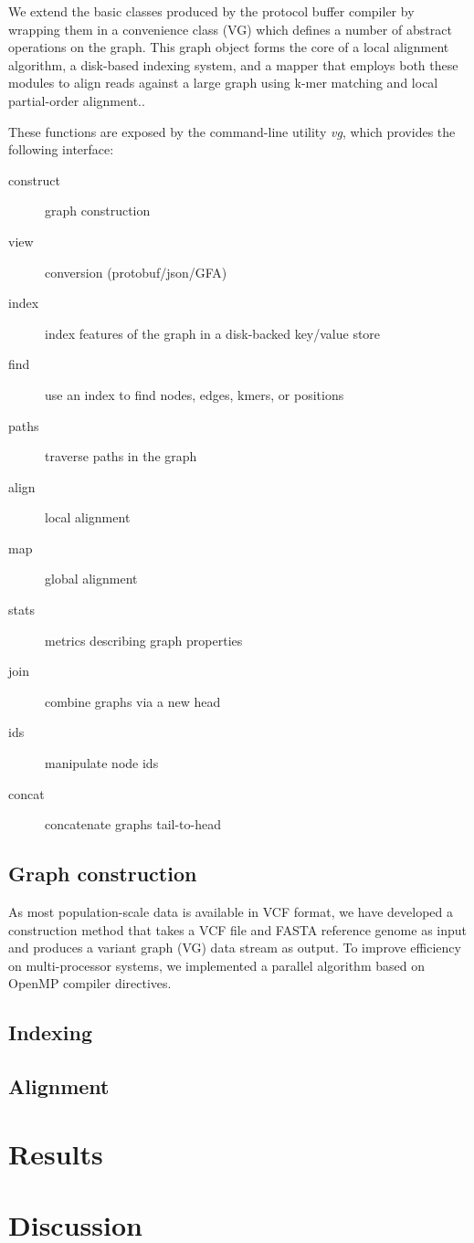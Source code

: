 \documentclass{article}
\begin{document}
We extend the basic classes produced by the protocol buffer compiler by wrapping them in a convenience class (VG) which defines a number of abstract operations on the graph. This graph object forms the core of a local alignment algorithm, a disk-based indexing system, and a mapper that employs both these modules to align reads against a large graph using k-mer matching and local partial-order alignment..

These functions are exposed by the command-line utility \emph{vg}, which provides the following interface:

\begin{description}
  \item[ construct    ] graph construction
  \item[ view         ] conversion (protobuf/json/GFA)
  \item[ index        ] index features of the graph in a disk-backed key/value store
  \item[ find         ] use an index to find nodes, edges, kmers, or positions
  \item[ paths        ] traverse paths in the graph
  \item[ align        ] local alignment
  \item[ map          ] global alignment
  \item[ stats        ] metrics describing graph properties
  \item[ join         ] combine graphs via a new head
  \item[ ids          ] manipulate node ids
  \item[ concat       ] concatenate graphs tail-to-head
\end{description}

\subsection{Graph construction}

As most population-scale data is available in VCF format, we have developed a construction method that takes a VCF file and FASTA reference genome as input and produces a variant graph (VG) data stream as output.
To improve efficiency on multi-processor systems, we implemented a parallel algorithm based on OpenMP compiler directives.


\subsection{Indexing}


\subsection{Alignment}


\section{Results}


\section{Discussion}

{}


\end{document}
